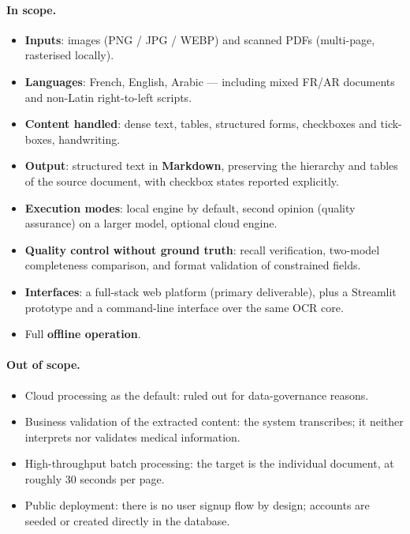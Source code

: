 \documentclass[11pt,a4paper]{article}
\begin{document}
\paragraph{In scope.}
\begin{itemize}
  \item \textbf{Inputs}: images (PNG / JPG / WEBP) and scanned PDFs
        (multi-page, rasterised locally).
  \item \textbf{Languages}: French, English, Arabic --- including mixed FR/AR
        documents and non-Latin right-to-left scripts.
  \item \textbf{Content handled}: dense text, tables, structured forms,
        checkboxes and tick-boxes, handwriting.
  \item \textbf{Output}: structured text in \textbf{Markdown}, preserving the
        hierarchy and tables of the source document, with checkbox states
        reported explicitly.
  \item \textbf{Execution modes}: local engine by default, second opinion
        (quality assurance) on a larger model, optional cloud engine.
  \item \textbf{Quality control without ground truth}: recall verification,
        two-model completeness comparison, and format validation of
        constrained fields.
  \item \textbf{Interfaces}: a full-stack web platform (primary deliverable),
        plus a Streamlit prototype and a command-line interface over the same
        OCR core.
  \item Full \textbf{offline operation}.
\end{itemize}

\paragraph{Out of scope.}
\begin{itemize}
  \item Cloud processing as the default: ruled out for data-governance reasons.
  \item Business validation of the extracted content: the system transcribes;
        it neither interprets nor validates medical information.
  \item High-throughput batch processing: the target is the individual
        document, at roughly 30 seconds per page.
  \item Public deployment: there is no user signup flow by design; accounts are
        seeded or created directly in the database.
\end{itemize}
\end{document}
